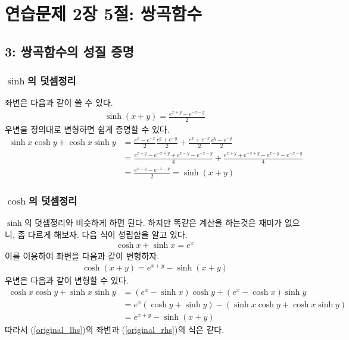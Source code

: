 \section{연습문제 2장 5절: 쌍곡함수}
\subsection{3: 쌍곡함수의 성질 증명}
\subsubsection{$\sinh$의 덧셈정리}
좌변은 다음과 같이 쓸 수 있다.
\begin{align*}
\sinh(x+y)=\frac{e^{x+y}-e^{-x-y}}{2}
\end{align*}
우변을 정의대로 변형하면 쉽게 증명할 수 있다.
\begin{align*}
\sinh x\cosh y+\cosh x\sinh y&=\frac{e^x-e^{-x}}{2}\frac{e^y+e^{-y}}{2}+\frac{e^x+e^{-x}}{2}\frac{e^y-e^{-y}}{2}\\
&=\frac{e^{x+y}-e^{-x+y}+e^{x-y}-e^{-x-y}}{4}+\frac{e^{x+y}+e^{-x+y}-e^{x-y}-e^{-x-y}}{4}\\
&=\frac{e^{x+y}-e^{-x-y}}{2}=\sinh(x+y)
\end{align*}

\subsubsection{$\cosh$의 덧셈정리}
$\sinh$의 덧셈정리와 비슷하게 하면 된다. 하지만 똑같은 계산을 하는것은 재미가 없으니, 좀 다르게 해보자. 다음 식이 성립함을 알고 있다.
\begin{align}\label{cosh_plus_sinh}
\cosh x+\sinh x=e^x
\end{align}
이를 이용하여 좌변을 다음과 같이 변형하자.
\begin{align}
\label{original_lhs}\cosh(x+y)=e^{x+y}-\sinh(x+y)
\end{align}
우변은 다음과 같이 변형할 수 있다.
\begin{align}
\label{original_rhs}\cosh x\cosh y+\sinh x\sinh y&=(e^x-\sinh x)\cosh y+(e^x-\cosh x)\sinh y\\
&=e^x(\cosh y+\sinh y)-(\sinh x\cosh y+\cosh x\sinh y) \nonumber\\
&=e^{x+y}-\sinh(x+y) \nonumber
\end{align}
따라서 (\ref{original_lhs})의 좌변과 (\ref{original_rhs})의 식은 같다.

